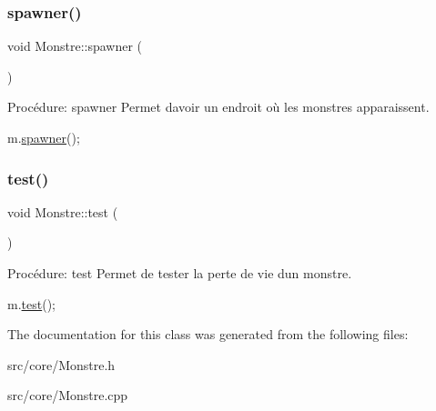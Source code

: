 \subsubsection{\texorpdfstring{spawner()}{spawner()}}
{\footnotesize\ttfamily void Monstre\+::spawner (\begin{DoxyParamCaption}{ }\end{DoxyParamCaption})}



Procédure\+: spawner Permet d\textquotesingle{}avoir un endroit où les monstres apparaissent. 


\begin{DoxyCode}
m.\hyperlink{classMonstre_a26db17b29af1a99278e7d21bc91f1532}{spawner}();
\end{DoxyCode}
 \mbox{\label{classMonstre_a4f22d17531f5ca164355740d035485ee}} 
\subsubsection{\texorpdfstring{test()}{test()}}
{\footnotesize\ttfamily void Monstre\+::test (\begin{DoxyParamCaption}{ }\end{DoxyParamCaption})}



Procédure\+: test Permet de tester la perte de vie d\textquotesingle{}un monstre. 


\begin{DoxyCode}
m.\hyperlink{classMonstre_a4f22d17531f5ca164355740d035485ee}{test}();
\end{DoxyCode}
 

The documentation for this class was generated from the following files\+:\begin{DoxyCompactItemize}
\item 
src/core/Monstre.\+h\item 
src/core/Monstre.\+cpp\end{DoxyCompactItemize}
